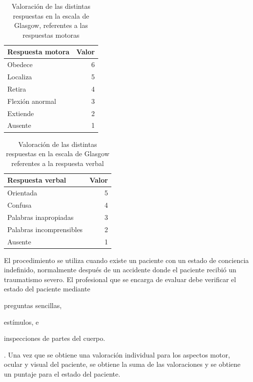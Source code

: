 \begin{table}[!hbt]
\centering
\begin{tabular}{lr}
\toprule
\textbf{Respuesta motora} & \textbf{Valor} \\
\midrule
Obedece & 6 \\
Localiza & 5 \\
Retira & 4 \\
Flexión anormal & 3 \\
Extiende & 2 \\
Ausente & 1 \\
\bottomrule
\end{tabular}
\caption{Valoración de las distintas respuestas en la escala de Glasgow,
    referentes a las respuestas motoras}
\label{tab:seleccion_glasgow_respuestas_motor}
\end{table}

\begin{table}[!hbt]
\centering
\begin{tabular}{lr}
\toprule
\textbf{Respuesta verbal} & \textbf{Valor} \\
\midrule
Orientada & 5 \\
Confusa & 4 \\
Palabras inapropiadas & 3 \\
Palabras incomprensibles & 2 \\
Ausente & 1 \\
\bottomrule
\end{tabular}
\caption{Valoración de las distintas respuestas en la escala de Glasgow
    referentes a la respuesta verbal}
\label{tab:seleccion_glasgow_respuestas_verbal}
\end{table}

El procedimiento se utiliza cuando existe un paciente con un estado de
conciencia indefinido, normalmente después de un accidente donde el paciente
recibió un traumatismo severo. El profesional que se encarga de evaluar debe
verificar el estado del paciente mediante
\begin{enumerate*}[label=\itshape\alph*\upshape.]
\item preguntas sencillas,
\item estímulos, e
\item inspecciones de partes del cuerpo.
\end{enumerate*}. 
Una vez que se obtiene una valoración individual para los aspectos
motor, ocular y visual del paciente, se obtiene la suma de las valoraciones y se
obtiene un puntaje para el estado del paciente.

